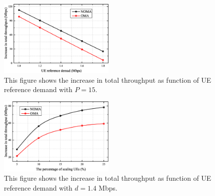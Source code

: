 \documentclass[10pt,journal,final,finalsubmission,twocolumn]{IEEEtran}
\begin{document}
\begin{figure}
\centering
\includegraphics[width=0.5\textwidth]{3.eps}
\caption{This figure shows the increase in total throughput as function of UE reference demand with $P = 15$.}
\label{3}
\end{figure}

\begin{figure}
\centering
\includegraphics[width=0.5\textwidth]{4.eps}
\caption{This figure shows the increase in total throughput as function of UE reference demand with $d = 1.4$ Mbps.}
\label{4}
\end{figure}
\end{document}
